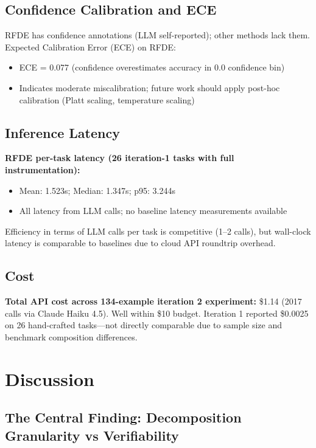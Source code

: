 \documentclass[11pt,letterpaper]{article}
\begin{document}
\subsection{Confidence Calibration and ECE}

RFDE has confidence annotations (LLM self-reported); other methods lack them. Expected Calibration Error (ECE) on RFDE:
\begin{itemize}
  \item ECE = 0.077 (confidence overestimates accuracy in 0.0 confidence bin)
  \item Indicates moderate miscalibration; future work should apply post-hoc calibration (Platt scaling, temperature scaling)
\end{itemize}

\subsection{Inference Latency}

\textbf{RFDE per-task latency (26 iteration-1 tasks with full instrumentation):}
\begin{itemize}
  \item Mean: 1.523s; Median: 1.347s; p95: 3.244s
  \item All latency from LLM calls; no baseline latency measurements available
\end{itemize}

Efficiency in terms of LLM calls per task is competitive (1--2 calls), but wall-clock latency is comparable to baselines due to cloud API roundtrip overhead.

\subsection{Cost}

\textbf{Total API cost across 134-example iteration 2 experiment:} \$1.14 (2017 calls via Claude Haiku 4.5). Well within \$10 budget. Iteration 1 reported \$0.0025 on 26 hand-crafted tasks---not directly comparable due to sample size and benchmark composition differences.

\section{Discussion}

\subsection{The Central Finding: Decomposition Granularity vs Verifiability}
\end{document}
